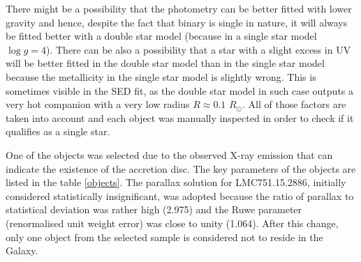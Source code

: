 \documentclass{pracalicmgr}
\begin{document}
There might be a possibility that the photometry can be better fitted with lower gravity and hence, despite the fact that binary
is single in nature, it will always be fitted better with a double star model (because in a single star model $\log g=4$).
There can be also a possibility that a star with a slight excess in UV will be better fitted in the double star model than in the single star model
because the metallicity in the single star model is slightly wrong. This is sometimes visible in the SED fit, as the double star model in such case
outputs a very hot companion with a very low radius $R\approx 0.1$ $R_\odot$. All of those factors are taken into account 
and each object was manually inspected in order to check if it qualifies as a single star.


One of the objects was selected due to the observed X-ray emission 
that can indicate the existence of the accretion disc.
The key parameters of the objects are listed in the table \ref{objects}.
The parallax
solution for LMC751.15.2886, initially considered statistically insignificant, was adopted
because the ratio of parallax to statistical deviation was rather high (2.975) and
the Ruwe parameter (renormalised unit weight error) was close to unity (1.064). After this
change, only one object from the selected sample is considered not to reside in the Galaxy.
\end{document}
